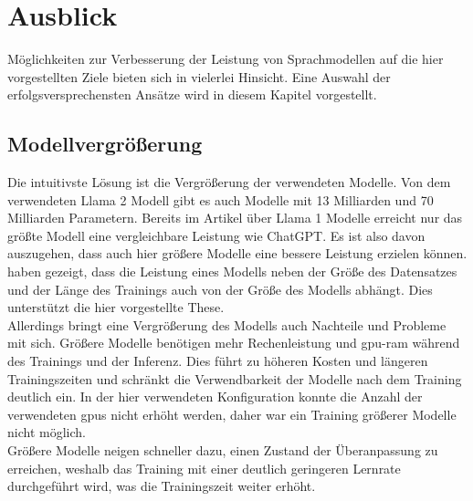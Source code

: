 \chapter{Ausblick}\label{ch:futurework}
Möglichkeiten zur Verbesserung der Leistung von Sprachmodellen auf die hier vorgestellten Ziele bieten sich in vielerlei Hinsicht.
Eine Auswahl der erfolgsversprechensten Ansätze wird in diesem Kapitel vorgestellt.

\section{Modellvergrößerung}
Die intuitivste Lösung ist die Vergrößerung der verwendeten Modelle.
Von dem verwendeten Llama 2 Modell gibt es auch Modelle mit 13 Milliarden und 70 Milliarden Parametern.
Bereits im Artikel \citet{llama} über Llama 1 Modelle erreicht nur das größte Modell eine vergleichbare Leistung wie ChatGPT. Es ist also davon auszugehen, dass auch hier größere Modelle eine bessere Leistung erzielen können.
\citet{scaling_laws} haben gezeigt, dass die Leistung eines Modells neben der Größe des Datensatzes und der Länge des Trainings auch von der Größe des Modells abhängt.
Dies unterstützt die hier vorgestellte These.\\

Allerdings bringt eine Vergrößerung des Modells auch Nachteile und Probleme mit sich.
Größere Modelle benötigen mehr Rechenleistung und \ac{gpu}-\ac{ram} während des Trainings und der Inferenz.
Dies führt zu höheren Kosten und längeren Trainingszeiten
und schränkt die Verwendbarkeit der Modelle nach dem Training deutlich ein.
In der hier verwendeten Konfiguration konnte die Anzahl der verwendeten \acp{gpu} nicht erhöht werden,
daher war ein Training größerer Modelle nicht möglich.\\

Größere Modelle neigen schneller dazu, einen Zustand der Überanpassung zu erreichen, weshalb das Training mit einer deutlich geringeren Lernrate durchgeführt wird, was die Trainingszeit weiter erhöht.\\

